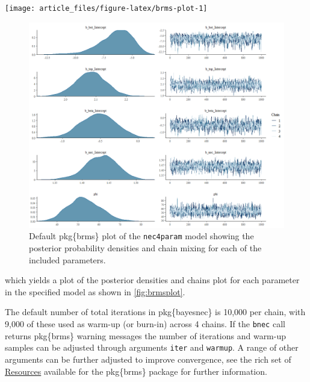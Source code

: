 \documentclass[
]{jss}
\begin{document}
\begin{CodeChunk}


\begin{center}\texttt{[image: article\_files/figure-latex/brms-plot-1]} \end{center}

\end{CodeChunk}

\begin{figure}
\centering
\includegraphics{brms_plot.png}
\caption{Default pkg\{brms\} plot of the \texttt{nec4param} model
showing the posterior probability densities and chain mixing for each of
the included parameters.\label{fig:brmsplot}}
\end{figure}

which yields a plot of the posterior densities and chains plot for each
parameter in the specified model as shown in \autoref{fig:brmsplot}.

The default number of total iterations in pkg\{bayesnec\} is 10,000 per
chain, with 9,000 of these used as warm-up (or burn-in) across 4 chains.
If the \texttt{bnec} call returns pkg\{brms\} warning messages the
number of iterations and warm-up samples can be adjusted through
arguments \texttt{iter} and \texttt{warmup}. A range of other arguments
can be further adjusted to improve convergence, see the rich set of
\href{https://github.com/paul-buerkner/brms}{Resources} available for
the pkg\{brms\} package for further information.
\end{document}
